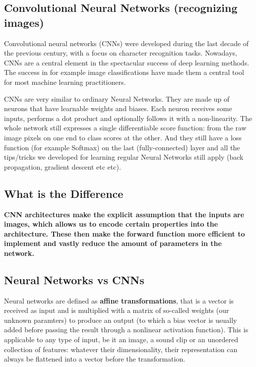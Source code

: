 \documentclass[%
oneside,                 %
final,                   %
10pt]{article}
\begin{document}
\subsection{Convolutional Neural Networks (recognizing images)}

Convolutional neural networks (CNNs) were developed during the last
decade of the previous century, with a focus on character recognition
tasks. Nowadays, CNNs are a central element in the spectacular success
of deep learning methods. The success in for example image
classifications have made them a central tool for most machine
learning practitioners.

CNNs are very similar to ordinary Neural Networks.
They are made up of neurons that have learnable weights and
biases. Each neuron receives some inputs, performs a dot product and
optionally follows it with a non-linearity. The whole network still
expresses a single differentiable score function: from the raw image
pixels on one end to class scores at the other. And they still have a
loss function (for example Softmax) on the last (fully-connected) layer
and all the tips/tricks we developed for learning regular Neural
Networks still apply (back propagation, gradient descent etc etc).

\subsection{What is the Difference}

\textbf{CNN architectures make the explicit assumption that
the inputs are images, which allows us to encode certain properties
into the architecture. These then make the forward function more
efficient to implement and vastly reduce the amount of parameters in
the network.}

\subsection{Neural Networks vs CNNs}

Neural networks are defined as \textbf{affine transformations}, that is 
a vector is received as input and is multiplied with a matrix of so-called weights (our unknown paramters) to produce an
output (to which a bias vector is usually added before passing the result
through a nonlinear activation function). This is applicable to any type of input, be it an
image, a sound clip or an unordered collection of features: whatever their
dimensionality, their representation can always be flattened into a vector
before the transformation.
\end{document}
